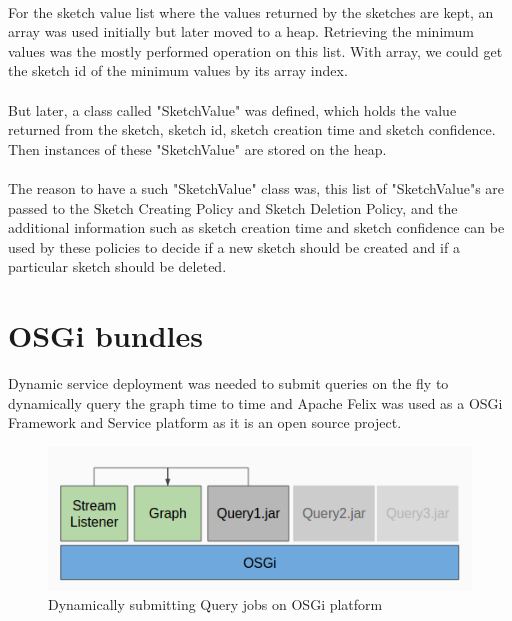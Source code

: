 \documentclass[12pt]{report}
\numberwithin{figure}{section}
\numberwithin{table}{section}
\begin{document}
\paragraph{}

For the sketch value list where the values returned by the sketches are kept, an array was used initially but later moved to a heap. Retrieving the minimum values was the mostly performed operation on this list.  With array, we could get the sketch id of the minimum values by its array index. 

\paragraph{}

But later, a class called "SketchValue" was defined, which holds the value returned from the sketch, sketch id, sketch creation time and sketch confidence. Then instances of these "SketchValue" are stored on the heap. 

\paragraph{}

The reason to have a such "SketchValue" class was, this list of "SketchValue"s are passed to the Sketch Creating Policy and Sketch Deletion Policy, and the additional information such as sketch creation time and sketch confidence can be used by these policies to decide if a new sketch should be created and if a particular sketch should be deleted.
 
\section{OSGi bundles}

Dynamic service deployment was needed to submit queries on the fly to dynamically query the graph time to time and Apache Felix was used as a OSGi Framework and Service platform as it is an open source project. 

\begin{figure}[H]
\centering
\includegraphics[scale=0.6]{images/OSGi}
\caption{Dynamically submitting Query jobs on OSGi platform}
\end{figure}
\end{document}
